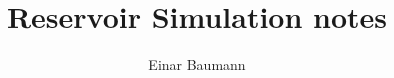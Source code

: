 



\author{Einar Baumann}
\title{Reservoir Simulation notes}


  \maketitle
  \clearpage

 \clearpage
 \clearpage
 \clearpage
 \clearpage
 \clearpage



